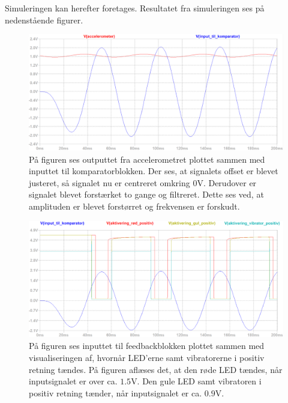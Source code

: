 \noindent Simuleringen kan herefter foretages. Resultatet fra simuleringen ses på nedenstående figurer.
\begin{figure}[H]
	\centering
	\includegraphics[scale=.38]{figures/cProblemloesning/Samlet_system_sim12.PNG}
	\caption{På figuren ses outputtet fra accelerometret plottet sammen med inputtet til komparatorblokken. Der ses, at signalets offset er blevet justeret, så signalet nu er centreret omkring 0V. Derudover er signalet blevet forstærket to gange og filtreret. Dette ses ved, at amplituden er blevet forstørret og frekvensen er forskudt.}
	\label{fig:samlet_system_sim1}
\end{figure}
\begin{figure}[H]
	\centering
	\includegraphics[scale=.38]{figures/cProblemloesning/Samlet_system_sim3.PNG}
	\caption{På figuren ses inputtet til feedbackblokken plottet sammen med visualiseringen af, hvornår LED'erne samt vibratorerne i positiv retning tændes. På figuren aflæses det, at den røde LED tændes, når inputsignalet er over ca. $1.5$V. Den gule LED samt vibratoren i positiv retning tænder, når inputsignalet er ca. $0.9$V.}
	\label{fig:samlet_system_sim2}
\end{figure}
